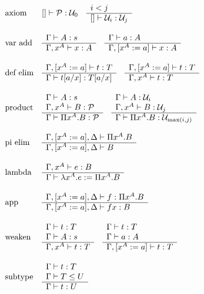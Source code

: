 $$
\begin{array}{lllll} 
    \text{axiom} &
    [] \vdash {\mathcal P}: {\mathcal U}_0
    \quad
    \begin{array}{l} 
        i < j
     \\ \hline 
        [] \vdash {\mathcal U}_i : {\mathcal U}_j
     \end{array}
    \\
    \\
    \text{var add} &
    \begin{array}{l} 
        \Gamma \vdash A: s
     \\ \hline 
        \Gamma, x^A \vdash x: A
     \end{array}
    \quad
    \begin{array}{l} 
        \Gamma \vdash a: A
     \\ \hline 
        \Gamma, [x^A := a] \vdash x: A
     \end{array}
    \\
    \\
    \text{def elim} &
    \begin{array}{l} 
        \Gamma, [x^A:= a] \vdash t : T
     \\ \hline 
        \Gamma \vdash t[a/x] : T[a/x]
     \end{array}
    \quad
    \begin{array}{l} 
        \Gamma, [x^A:= a] \vdash t : T
     \\ \hline 
        \Gamma, x^A \vdash t : T
     \end{array}
    \\
    \\
    \text{product} &
    \begin{array}{l} 
        \Gamma \vdash A: s
        \\
        \Gamma, x^A \vdash B: {\mathcal P}
     \\ \hline 
        \Gamma \vdash \Pi x^A. B: {\mathcal P}
     \end{array}
    \quad
    \begin{array}{l} 
        \Gamma \vdash A: {\mathcal U}_i
        \\
        \Gamma, x^A \vdash B: {\mathcal U}_j
     \\ \hline 
        \Gamma \vdash \Pi x^A. B: {\mathcal U}_{\text{max}(i,j)}
     \end{array}
    \\
    \\
    \text{pi elim} &
    \begin{array}{l} 
        \Gamma,[x^A:=a],\Delta \vdash \Pi x^A. B
     \\ \hline 
        \Gamma,[x^A:=a],\Delta \vdash B
     \end{array}
    \\
    \\
    \text{lambda} &
    \begin{array}{l} 
        \Gamma, x^A \vdash e : B
     \\ \hline 
        \Gamma \vdash \lambda x^A. e := \Pi x^A. B
     \end{array}
    \\
    \\
    \text{app} &
    \begin{array}{l} 
        \Gamma, [x^A:=a], \Delta \vdash f : \Pi x^A. B
     \\ \hline 
        \Gamma, [x^A := a], \Delta \vdash f x: B
     \end{array}
    \\
    \\
    \text{weaken} &
    \begin{array}{l} 
        \Gamma \vdash t: T
        \\
        \Gamma \vdash A: s
     \\ \hline 
        \Gamma, x^A \vdash t : T
     \end{array}
    \quad
    \begin{array}{l} 
        \Gamma \vdash t: T
        \\
        \Gamma \vdash a: A
     \\ \hline 
        \Gamma, [x^A:=a] \vdash t : T
     \end{array}
    \\
    \\
    \text{subtype} &
    \begin{array}{l} 
        \Gamma \vdash t : T
        \\
        \Gamma \vdash T \le U
     \\ \hline 
        \Gamma \vdash t: U
     \end{array}
 \end{array}
$$


